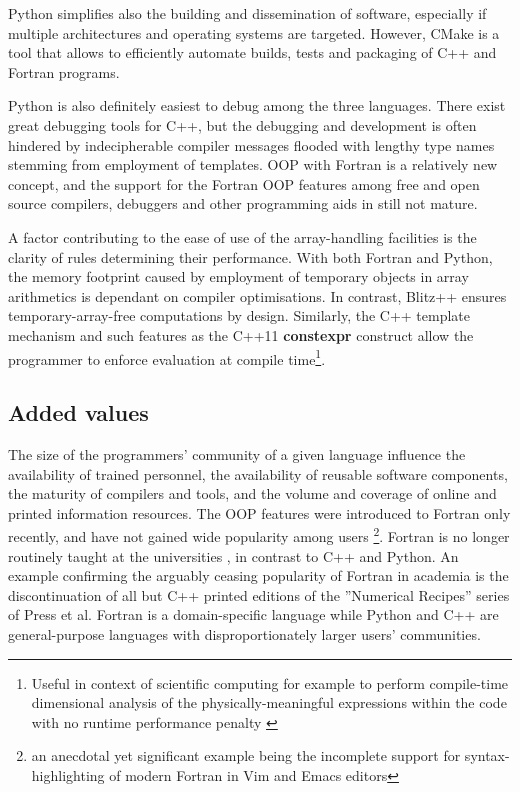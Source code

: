 \documentclass[final,5p,times,twocolumn]{elsarticle}
\newcommand{\prog}[1]{{\rm\bf#1}}
\begin{document}
  Python simplifies also the building and dissemination of software,
    especially if multiple architectures and operating systems are targeted.
  However, CMake is a tool that allows to efficiently automate builds, tests and 
    packaging of C++ and Fortran programs.

  Python is also definitely easiest to debug among the three languages.
  There exist great debugging tools for C++, but the debugging and development is 
    often hindered by indecipherable compiler messages flooded with lengthy type names
    stemming from employment of templates.
  OOP with Fortran is a relatively new concept, and the support for the Fortran OOP
    features among free and open source compilers, debuggers and other programming
    aids in still not mature.
    
  A factor contributing to the ease of use of the array-handling 
    facilities is the clarity of rules determining their performance.
  With both Fortran and Python, the memory footprint caused by employment
    of temporary objects in array arithmetics is dependant on compiler optimisations.
  In contrast, Blitz++ ensures temporary-array-free computations by design.
  Similarly, the C++ template mechanism and such features as the C++11
    \prog{constexpr} construct allow the programmer to enforce evaluation
    at compile time\footnote{Useful in context of scientific computing for example to perform
    compile-time dimensional analysis of the physically-meaningful expressions within
    the code with no runtime performance penalty \citet{Schabel_et_al_2008}}.

  \subsection{Added values}

  The size of the programmers' community of a given language 
    influence the availability of trained personnel, 
    the availability of reusable software components,
    the maturity of compilers and tools, 
    and the volume and coverage of online and printed information resources.
  The OOP features were introduced to Fortran only recently, and have not gained
    wide popularity among users \citep{Worth_2008}\footnote{an anecdotal yet significant
    example being the incomplete support for syntax-highlighting of modern Fortran in Vim and Emacs editors}.
  Fortran is no longer routinely taught at the universities \citep{Kendall_et_al_2008},
    in contrast to C++ and Python.
  An example confirming the arguably ceasing popularity of Fortran in academia 
    is the discontinuation of all but C++ printed editions of the ''Numerical Recipes'' 
    series of Press et al.
  Fortran is a domain-specific language while Python and C++ are general-purpose languages
    with disproportionately larger users' communities.
\end{document}

